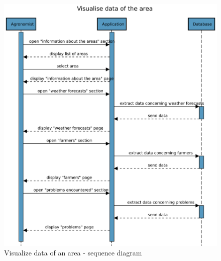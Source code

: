 \begin{figure}[H]
    \centering
    \includegraphics[scale=0.75]{Images/Sequence diagrams/Agronomist - visualise data of the area.pdf}

    \caption{Visualize data of an area - sequence diagram}
    \label{fig:fig:seq_diag_visualize_area}
\end{figure}



